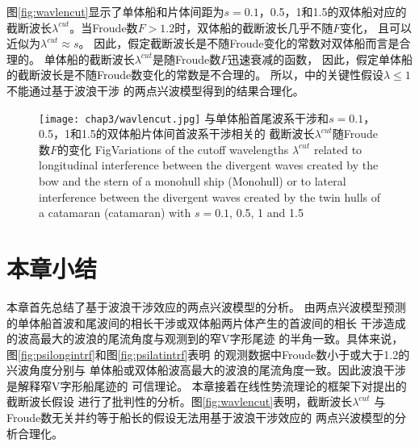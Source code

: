 图\ref{fig:wavlencut}显示了单体船和片体间距为$s=0.1$，0.5，1和1.5的双体船对应的
截断波长$\lambda^{cut}$。当Froude数$F>1.2$时，双体船的截断波长几乎不随$F$变化，
且可以近似为$\lambda^{cut}\approx s$。
因此，假定截断波长是不随Froude变化的常数对双体船而言是合理的。
单体船的截断波长$\lambda^{cut}$是随Froude数$F$迅速衰减的函数，
因此，假定单体船的截断波长是不随Froude数变化的常数是不合理的。
所以，\parencite{Rabaud2013Ship}中的关键性假设$\lambda\le1$不能通过基于波浪干涉
的两点兴波模型得到的结果合理化。
%
\begin{figure}[htp]
  \centering
  \captionstyle{\centering}
  \texttt{[image: chap3/wavlencut.jpg]}
  {与单体船首尾波系干涉和$s=0.1$，0.5，1和1.5的双体船片体间首波系干涉相关的
    截断波长$\lambda^{cut}$随Froude数$F$的变化}
  {Fig}{Variations of the cutoff wavelengths $\lambda^{cut}$ related to
  longitudinal interference between the divergent waves created by the bow
  and the stern of a monohull ship (Monohull) or to lateral interference
  between the divergent waves created by the twin hulls of a catamaran (catamaran)
with $s=0.1$, 0.5, 1 and 1.5}
\end{figure}


\section{本章小结}
\label{sec:analyssum}
本章首先总结了基于波浪干涉效应的两点兴波模型的分析。
由两点兴波模型预测的单体船首波和尾波间的相长干涉或双体船两片体产生的首波间的相长
干涉造成的波高最大的波浪的尾流角度与\parencite{Rabaud2013Ship}观测到的窄V字形尾迹
的半角一致。具体来说，图\ref{fig:psilongintrf}和图\ref{fig:psilatintrf}表明
\parencite{Rabaud2013Ship}的观测数据中Froude数小于或大于1.2的兴波角度分别与
单体船或双体船波高最大的波浪的尾流角度一致。因此波浪干涉是解释窄V字形船尾迹的
可信理论。
本章接着在线性势流理论的框架下对\parencite{Rabaud2013Ship}提出的截断波长假设
进行了批判性的分析。图\ref{fig:wavlencut}表明，截断波长$\lambda^{cut}$
与Froude数无关并约等于船长的假设\supercite{Rabaud2013Ship}无法用基于波浪干涉效应的
两点兴波模型\supercite{Noblesse2014Why}的分析合理化。
